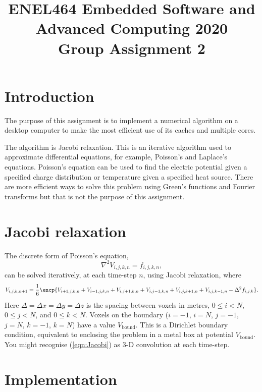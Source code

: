 \documentclass[a4paper,11pt]{article}
\begin{document}
\title{ \bf ENEL464 Embedded Software and Advanced Computing 2020 \\ Group Assignment 2}
\author{}
\date{}
\maketitle


\section{Introduction}

The purpose of this assignment is to implement a numerical algorithm
on a desktop computer to make the most efficient use of its caches and
multiple cores.

The algorithm is Jacobi relaxation.  This is an iterative algorithm
used to approximate differential equations, for example, Poisson's and
Laplace's equations.  Poisson's equation can be used to find the
electric potential given a specified charge distribution or
temperature given a specified heat source.  There are more efficient
ways to solve this problem using Green's functions and Fourier
transforms but that is not the purpose of this assignment.

\section{Jacobi relaxation}

The discrete form of Poisson's equation,
%
\begin{equation}
  \nabla^2 V_{i,j,k,n} = f_{i,j,k,n},
\end{equation}
%
can be solved iteratively, at each time-step $n$, using Jacobi
relaxation, where
%
\begin{equation}
  V_{i,j,k,n+1} = \frac{1}{6}\encp{V_{i+1,j,k,n} + V_{i-1,j,k,n} + V_{i,j+1,k,n} + V_{i,j-1,k,n} + V_{i,j,k+1,n} + V_{i,j,k-1,n} - \Delta^2 f_{i,j,k}}.
\label{eqn:Jacobi}
\end{equation}
%
Here $\Delta = \Delta x = \Delta y = \Delta z$ is the spacing between
voxels in metres, $0 \le i < N$, $0 \le j < N$, and $0 \le k < N$.
Voxels on the boundary ($i = -1$, $i=N$, $j = -1$, $j=N$, $k = -1$,
$k=N$) have a value $V_{\mathrm{bound}}$.  This is a Dirichlet
boundary condition, equivalent to enclosing the problem in a metal box
at potential $V_{\mathrm{bound}}$.  You might recognise
(\ref{eqn:Jacobi}) as 3-D convolution at each time-step.

\section{Implementation}
\end{document}
